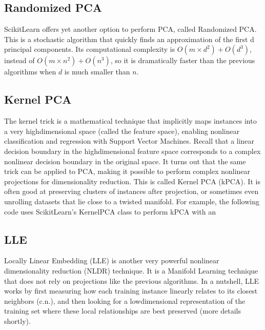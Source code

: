 \documentclass[letterpaper,10pt,english]{sphinxmanual}
\begin{document}
\subsection{Randomized PCA}
\label{\detokenize{chapter8:randomized-pca}}
Scikit\sphinxhyphen{}Learn offers yet another option to perform PCA, called Randomized PCA. This is a stochastic
algorithm that quickly finds an approximation of the first d principal components. Its computational
complexity is \(O(m \times d^2)+O(d^3)\), instead of \(O(m \times n^2) + O(n^3)\), so it is dramatically faster than the
previous algorithms when \(d\) is much smaller than \(n\).


\subsection{Kernel PCA}
\label{\detokenize{chapter8:kernel-pca}}
The kernel trick is a mathematical technique that implicitly maps instances into a
very high\sphinxhyphen{}dimensional space (called the feature space), enabling nonlinear classification and regression
with Support Vector Machines. Recall that a linear decision boundary in the high\sphinxhyphen{}dimensional feature
space corresponds to a complex nonlinear decision boundary in the original space.
It turns out that the same trick can be applied to PCA, making it possible to perform complex nonlinear
projections for dimensionality reduction. This is called Kernel PCA (kPCA). It is often good at
preserving clusters of instances after projection, or sometimes even unrolling datasets that lie close to a
twisted manifold.
For example, the following code uses Scikit\sphinxhyphen{}Learn’s KernelPCA class to perform kPCA with an

\begin{sphinxVerbatim}[commandchars=\\\{\}]
   
      
  
\end{sphinxVerbatim}


\subsection{LLE}
\label{\detokenize{chapter8:lle}}
Locally Linear Embedding (LLE) is another very powerful nonlinear dimensionality reduction
(NLDR) technique. It is a Manifold Learning technique that does not rely on projections like the previous
algorithms. In a nutshell, LLE works by first measuring how each training instance linearly relates to its
closest neighbors (c.n.), and then looking for a low\sphinxhyphen{}dimensional representation of the training set where
these local relationships are best preserved (more details shortly).
\end{document}
